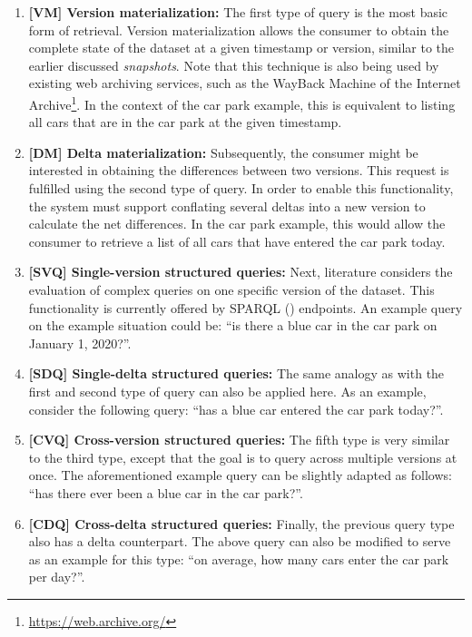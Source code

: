 \begin{enumerate}
    \item \textbf{[VM] Version materialization:} The first type of query is the most basic form of retrieval. Version materialization allows the consumer to obtain the complete state of the dataset at a given timestamp or version, similar to the earlier discussed \emph{snapshots}. Note that this technique is also being used by existing web archiving services, such as the WayBack Machine of the Internet Archive\footnote{\url{https://web.archive.org/}}. In the context of the car park example, this is equivalent to listing all cars that are in the car park at the given timestamp.
    
    \item \textbf{[DM] Delta materialization:} Subsequently, the consumer might be interested in obtaining the differences between two versions. This request is fulfilled using the second type of query. In order to enable this functionality, the system must support conflating several deltas into a new version to calculate the net differences. In the car park example, this would allow the consumer to retrieve a list of all cars that have entered the car park today.
    
    \item \textbf{[SVQ] Single-version structured queries:} Next, literature considers the evaluation of complex queries on one specific version of the dataset. This functionality is currently offered by SPARQL () endpoints. An example query on the example situation could be: ``is there a blue car in the car park on January 1, 2020?''.
    
    \item \textbf{[SDQ] Single-delta structured queries:} The same analogy as with the first and second type of query can also be applied here. As an example, consider the following query: ``has a blue car entered the car park today?''.
    
    \item \textbf{[CVQ] Cross-version structured queries:} The fifth type is very similar to the third type, except that the goal is to query across multiple versions at once. The aforementioned example query can be slightly adapted as follows: ``has there ever been a blue car in the car park?''.
    
    \item \textbf{[CDQ] Cross-delta structured queries:} Finally, the previous query type also has a delta counterpart. The above query can also be modified to serve as an example for this type: ``on average, how many cars enter the car park per day?''.
\end{enumerate}

